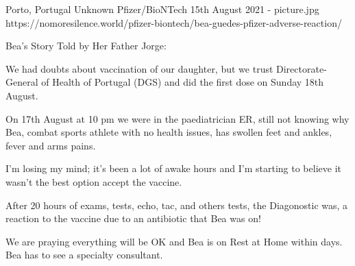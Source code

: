 {Porto, Portugal}
{Unknown}
{Pfizer/BioNTech}
{15th August 2021}
{-}
{picture.jpg}
{https://nomoresilence.world/pfizer-biontech/bea-guedes-pfizer-adverse-reaction/}
{

Bea’s Story Told by Her Father Jorge:

We had doubts about vaccination of our daughter, but we trust
Directorate-General of Health of Portugal (DGS) and did the first dose on Sunday
18th August.

On 17th August at 10 pm we were in the paediatrician ER, still not knowing why
Bea, combat sports athlete with no health issues, has swollen feet and ankles,
fever and arms pains.

I’m losing my mind; it’s been a lot of awake hours and I’m starting to believe
it wasn’t the best option accept the vaccine.

After 20 hours of exams, tests, echo, tac, and others tests, the Diagonostic
was, a reaction to the vaccine due to an antibiotic that Bea was on!

We are praying everything will be OK and Bea is on Rest at Home within days. Bea
has to see a specialty consultant.

}

